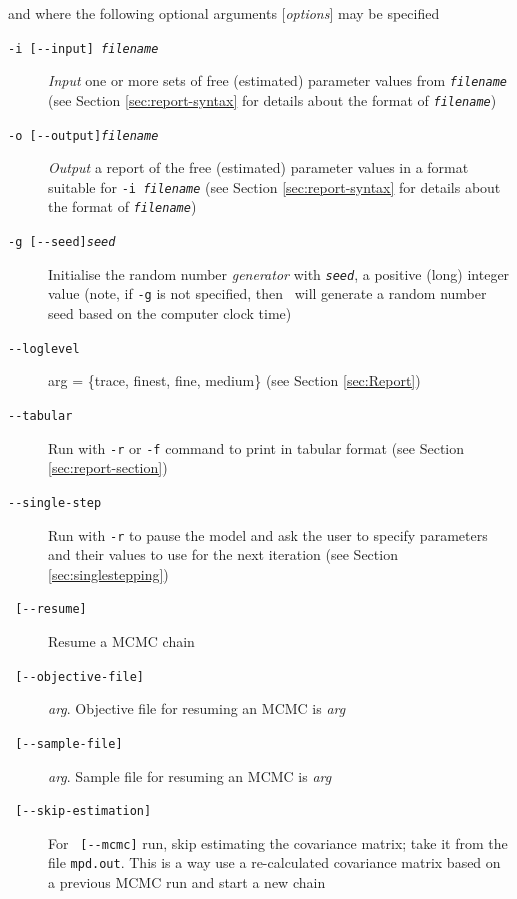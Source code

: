 and where the following optional arguments [\emph{options}] may be specified

\begin{description}
\item [\texttt{-i [-{}-input] \emph{filename}}] \emph{Input} one or more sets of free (estimated) parameter values from \texttt{\emph{filename}} (see Section \ref{sec:report-syntax} for details about the format of \texttt{\emph{filename}})

\item [\texttt{-o [-{}-output]\emph{filename}}] \emph{Output} a report of the free (estimated) parameter values in a format suitable for \texttt{-i \emph{filename}} (see Section \ref{sec:report-syntax} for details about the format of \texttt{\emph{filename}})

\item [\texttt{-g [-{}-seed]\emph{seed}}] Initialise the random number \emph{generator} with \texttt{\emph{seed}}, a positive (long) integer value (note, if \texttt{-g} is not specified, then \CNAME\ will  generate a random number seed based on the computer clock time)

\item [\texttt{-{}-loglevel}] arg = \{trace, finest, fine, medium\} (see Section \ref{sec:Report})

\item [\texttt{-{}-tabular}] Run with \texttt{-r} or \texttt{-f}  command to print  in tabular format (see Section \ref{sec:report-section})

\item [\texttt{-{}-single-step}] Run with \texttt{-r} to pause the model and ask the user to specify parameters and their values to use for the next iteration (see Section \ref{sec:singlestepping})

\item [\texttt{   [-{}-resume] }] Resume a MCMC chain

\item [\texttt{   [-{}-objective-file] }] \emph{arg}. Objective file for resuming an MCMC is \emph{arg}

\item [\texttt{   [-{}-sample-file] }] \emph{arg}. Sample file for resuming an MCMC is \emph{arg}

\item [\texttt{   [-{}-skip-estimation] }] For \texttt{   [-{}-mcmc]} run, skip estimating the covariance matrix; take it from the file \texttt{mpd.out}. This is a way use a re-calculated covariance matrix based on a previous MCMC run and start a new chain


\end{description}
